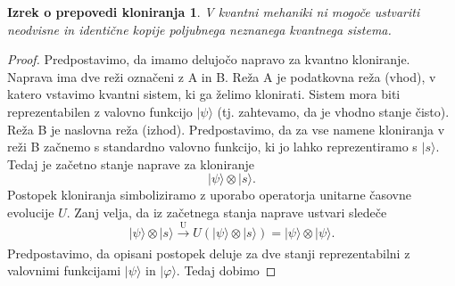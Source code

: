 \documentclass[12pt]{article}
\newtheorem*{remark}{Izrek o prepovedi kloniranja}
\begin{document}
 
\begin{remark} V kvantni mehaniki ni mogoče ustvariti neodvisne in identične kopije poljubnega neznanega kvantnega sistema. 
\end{remark}

\begin{proof}
Predpostavimo, da imamo delujočo napravo za kvantno kloniranje. Naprava ima dve reži označeni z A in B. Reža A je podatkovna reža (vhod), v katero vstavimo kvantni sistem, ki ga želimo klonirati. Sistem mora biti reprezentabilen z valovno funkcijo $| \psi \rangle$ (tj. zahtevamo, da je vhodno stanje čisto). Reža B je naslovna reža (izhod). Predpostavimo, da za vse namene kloniranja v reži B začnemo s standardno valovno funkcijo, ki jo lahko reprezentiramo s $| s \rangle$. Tedaj je začetno stanje naprave za kloniranje
\begin{equation}
| \psi \rangle \otimes | s \rangle.
\end{equation}
Postopek kloniranja simboliziramo z uporabo operatorja unitarne časovne evolucije $U$. Zanj velja, da iz začetnega stanja naprave ustvari sledeče
\begin{equation}
| \psi \rangle \otimes | s \rangle \xrightarrow[\text{}]{\text{U}} U(| \psi \rangle \otimes | s \rangle) = | \psi \rangle \otimes | \psi \rangle.
\end{equation}
Predpostavimo, da opisani postopek deluje za dve stanji reprezentabilni z valovnimi funkcijami $| \psi \rangle$ in $| \varphi \rangle$. Tedaj dobimo 


\end{proof}
\end{document}
